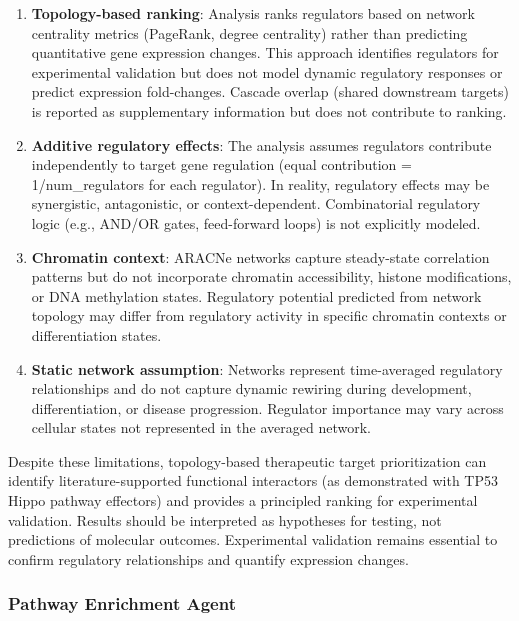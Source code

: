 \documentclass[11pt]{article}
\begin{document}
\begin{enumerate}
\item \textbf{Topology-based ranking}: Analysis ranks regulators based on network centrality metrics (PageRank, degree centrality) rather than predicting quantitative gene expression changes. This approach identifies regulators for experimental validation but does not model dynamic regulatory responses or predict expression fold-changes. Cascade overlap (shared downstream targets) is reported as supplementary information but does not contribute to ranking.

\item \textbf{Additive regulatory effects}: The analysis assumes regulators contribute independently to target gene regulation (equal contribution = 1/num\_regulators for each regulator). In reality, regulatory effects may be synergistic, antagonistic, or context-dependent. Combinatorial regulatory logic (e.g., AND/OR gates, feed-forward loops) is not explicitly modeled.

\item \textbf{Chromatin context}: ARACNe networks capture steady-state correlation patterns but do not incorporate chromatin accessibility, histone modifications, or DNA methylation states. Regulatory potential predicted from network topology may differ from regulatory activity in specific chromatin contexts or differentiation states.

\item \textbf{Static network assumption}: Networks represent time-averaged regulatory relationships and do not capture dynamic rewiring during development, differentiation, or disease progression. Regulator importance may vary across cellular states not represented in the averaged network.
\end{enumerate}

Despite these limitations, topology-based therapeutic target prioritization can identify literature-supported functional interactors (as demonstrated with TP53 Hippo pathway effectors) and provides a principled ranking for experimental validation. Results should be interpreted as hypotheses for testing, not predictions of molecular outcomes. Experimental validation remains essential to confirm regulatory relationships and quantify expression changes.

\subsubsection{Pathway Enrichment Agent}
\end{document}
